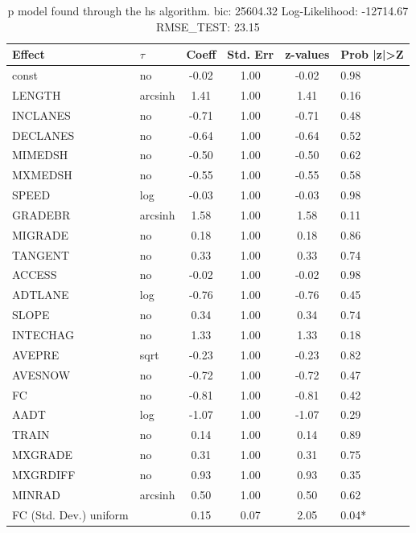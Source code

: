 \begin{table}
	\caption{p model found through the hs algorithm. bic: 25604.32 Log-Likelihood: -12714.67 RMSE_TEST: 23.15}
	\begin{center}
		\begin{tabular}{|l|l|c|c|c|l|}
			\hline
			Effect & $\tau$ & Coeff & Std. Err & z-values & Prob |z|>Z \\
			\hline
			const & no & -0.02 & 1.00 & -0.02 & 0.98 \\
			\hline
			LENGTH & arcsinh & 1.41 & 1.00 & 1.41 & 0.16 \\
			\hline
			INCLANES & no & -0.71 & 1.00 & -0.71 & 0.48 \\
			\hline
			DECLANES & no & -0.64 & 1.00 & -0.64 & 0.52 \\
			\hline
			MIMEDSH & no & -0.50 & 1.00 & -0.50 & 0.62 \\
			\hline
			MXMEDSH & no & -0.55 & 1.00 & -0.55 & 0.58 \\
			\hline
			SPEED & log & -0.03 & 1.00 & -0.03 & 0.98 \\
			\hline
			GRADEBR & arcsinh & 1.58 & 1.00 & 1.58 & 0.11 \\
			\hline
			MIGRADE & no & 0.18 & 1.00 & 0.18 & 0.86 \\
			\hline
			TANGENT & no & 0.33 & 1.00 & 0.33 & 0.74 \\
			\hline
			ACCESS & no & -0.02 & 1.00 & -0.02 & 0.98 \\
			\hline
			ADTLANE & log & -0.76 & 1.00 & -0.76 & 0.45 \\
			\hline
			SLOPE & no & 0.34 & 1.00 & 0.34 & 0.74 \\
			\hline
			INTECHAG & no & 1.33 & 1.00 & 1.33 & 0.18 \\
			\hline
			AVEPRE & sqrt & -0.23 & 1.00 & -0.23 & 0.82 \\
			\hline
			AVESNOW & no & -0.72 & 1.00 & -0.72 & 0.47 \\
			\hline
			FC & no & -0.81 & 1.00 & -0.81 & 0.42 \\
			\hline
			AADT & log & -1.07 & 1.00 & -1.07 & 0.29 \\
			\hline
			TRAIN & no & 0.14 & 1.00 & 0.14 & 0.89 \\
			\hline
			MXGRADE & no & 0.31 & 1.00 & 0.31 & 0.75 \\
			\hline
			MXGRDIFF & no & 0.93 & 1.00 & 0.93 & 0.35 \\
			\hline
			MINRAD & arcsinh & 0.50 & 1.00 & 0.50 & 0.62 \\
			\hline
			FC (Std. Dev.) uniform &  & 0.15 & 0.07 & 2.05 & 0.04* \\

\end{tabular}
\end{center}
\end{table}
